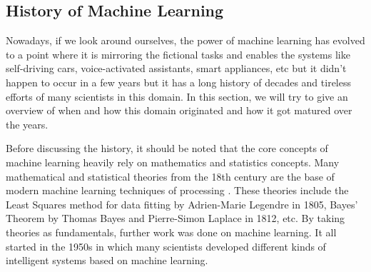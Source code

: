 \subsection{History of Machine Learning}
Nowadays, if we look around ourselves, the power of machine learning has evolved to a point where it is mirroring the fictional tasks and enables the systems like self-driving cars, voice-activated assistants, smart appliances, etc but it didn't happen to occur in a few years but it has a long history of decades and tireless efforts of many scientists in this domain. In this section, we will try to give an overview of when and how this domain originated and how it got matured over the years.
\newline
\par
Before discussing the history, it should be noted that the core concepts of machine learning heavily rely on mathematics and statistics concepts. Many mathematical and statistical theories from the 18th century are the base of modern machine learning techniques of processing \cite{ml_history1} \cite{ml_history2} \cite{ml_history3}. These theories include the Least Squares method for data fitting by Adrien-Marie Legendre in 1805, Bayes' Theorem by Thomas Bayes and Pierre-Simon Laplace in 1812, etc. By taking theories as fundamentals, further work was done on machine learning. It all started in the 1950s in which many scientists developed different kinds of intelligent systems based on machine learning. 
\newline
